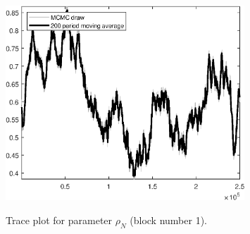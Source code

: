 \begin{figure}[H]
\centering
  \includegraphics[width=0.8\textwidth]{BRS_aggregate/graphs/TracePlot_rho_N_blck_1}\\
    \caption{Trace plot for parameter ${\rho_N}$ (block number 1).}
\end{figure}
